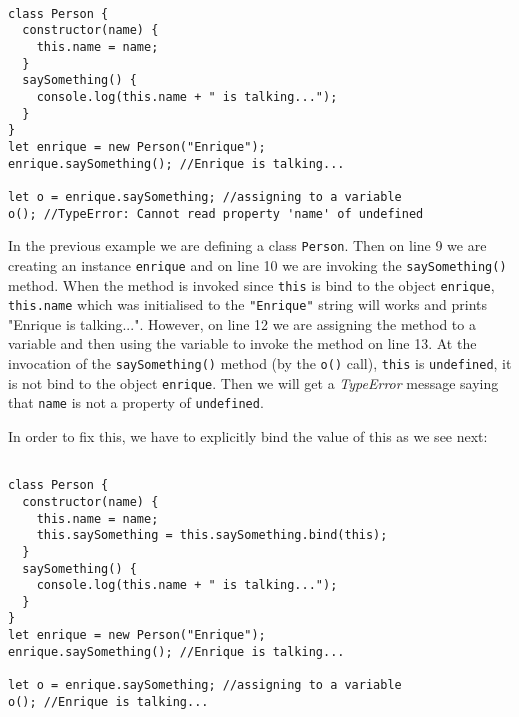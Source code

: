 \documentclass[a4paper, oneside, titlepage, 12pt]{book}
\begin{document}
\begin{verbatim}

class Person {
  constructor(name) {
    this.name = name;
  }
  saySomething() {
    console.log(this.name + " is talking...");
  }
}
let enrique = new Person("Enrique");
enrique.saySomething(); //Enrique is talking...

let o = enrique.saySomething; //assigning to a variable
o(); //TypeError: Cannot read property 'name' of undefined
\end{verbatim}

In the previous example we are defining a class \texttt{Person}. Then on line 9 we are creating an instance \texttt{enrique} and on line 10 we are invoking the \texttt{saySomething()} method. When the method is invoked since \texttt{this} is bind to the object \texttt{enrique}, \texttt{this.name} which was initialised to the \texttt{"Enrique"} string will works and prints "Enrique is talking...". However, on line 12 we are assigning the method to a variable and then using the variable to invoke the method on line 13. At the invocation of the \texttt{saySomething()} method (by the \texttt{o()} call), \texttt{this} is \texttt{undefined}, it is not bind to the object \texttt{enrique}. Then we will get a \textit{TypeError} message saying that \texttt{name} is not a property of \texttt{undefined}. 

In order to fix this, we have to explicitly bind the value of this as we see next:
 
\begin{verbatim}

class Person {
  constructor(name) {
    this.name = name;
    this.saySomething = this.saySomething.bind(this);    
  }
  saySomething() {
    console.log(this.name + " is talking...");
  }
}
let enrique = new Person("Enrique");
enrique.saySomething(); //Enrique is talking...

let o = enrique.saySomething; //assigning to a variable
o(); //Enrique is talking...
\end{verbatim}
\end{document}
